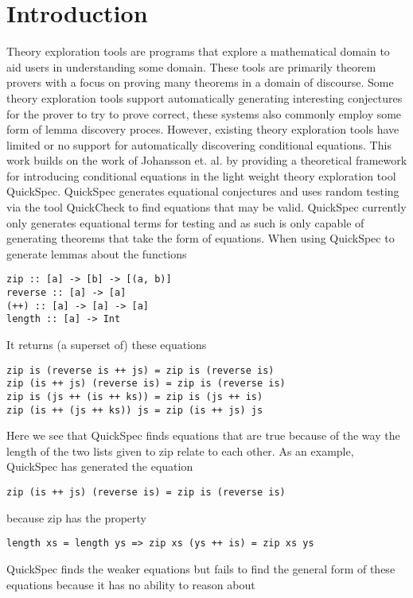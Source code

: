 \section{Introduction}
Theory exploration tools are programs that
explore a mathematical domain to aid users in
understanding some domain. %
These tools are primarily theorem provers with a focus
on proving many theorems in a domain of discourse.
Some theory exploration tools support automatically generating
interesting conjectures for the prover to try to prove correct,
these systems also commonly employ some form of lemma discovery proces\cite{heras2013}.
However, existing theory exploration tools have limited or no
support for automatically discovering conditional equations. %
This work builds on the work of Johansson et. al. \cite{Johansson2014}
by providing a theoretical framework for introducing conditional
equations in the light weight theory exploration tool QuickSpec.\cite{Claessen2010} 
QuickSpec generates equational conjectures and uses random testing via the tool QuickCheck \cite{Claessen2000}
to find equations that may be valid. QuickSpec currently only generates
equational terms for testing and as such is only capable of generating
theorems that take the form of equations. 
When using QuickSpec to generate lemmas about the functions
\begin{verbatim}
zip :: [a] -> [b] -> [(a, b)]
reverse :: [a] -> [a]
(++) :: [a] -> [a] -> [a]
length :: [a] -> Int
\end{verbatim}
It returns (a superset of) these equations
\begin{verbatim}
zip is (reverse is ++ js) = zip is (reverse is)
zip (is ++ js) (reverse is) = zip is (reverse is)
zip is (js ++ (is ++ ks)) = zip is (js ++ is)
zip (is ++ (js ++ ks)) js = zip (is ++ js) js
\end{verbatim}
Here we see that QuickSpec finds equations that are true
because of the way the length of the two lists given to zip relate
to each other. As an example, QuickSpec has generated the equation
\begin{verbatim}zip (is ++ js) (reverse is) = zip is (reverse is)\end{verbatim}
because zip has the property \begin{verbatim}length xs = length ys => zip xs (ys ++ is) = zip xs ys\end{verbatim}
QuickSpec finds the weaker equations but fails to find the general form
of these equations because it has no ability to reason about
